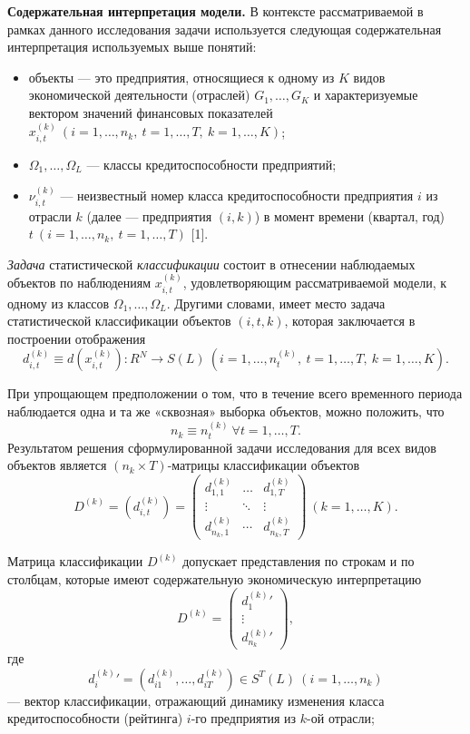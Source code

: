 \documentclass[14pt,a4paper]{extarticle}
\begin{document}
\textbf{Содержательная интерпретация модели.} В контексте рассматриваемой в рамках данного исследования задачи используется следующая содержательная интерпретация используемых выше понятий:
\begin{itemize}
    \item объекты --- это предприятия, относящиеся к одному из $K$ видов экономической деятельности (отраслей) $G_{1},\ldots,G_{K}$ и характеризуемые вектором значений финансовых показателей $x_{i,t}^{(k)}\ (i=1,\ldots,n_{k},\ t=1,\ldots,T,\ k=1,\ldots,K)$;
    \item $\Omega_{1},\ldots,\Omega_{L}$ --- классы кредитоспособности предприятий;
    \item $\nu_{i,t}^{(k)}$ --- неизвестный номер класса кредитоспособности предприятия $i$ из отрасли $k$ (далее --- предприятия $(i,k)$) в момент времени (квартал, год) $t\ (i=1,\ldots,n_{k},\ t=1,\ldots,T)$ [1].
\end{itemize}

\textit{Задача} статистической \textit{классификации} состоит в отнесении наблюдаемых объектов по наблюдениям $x_{i,t}^{(k)}$, удовлетворяющим рассматриваемой модели, к одному из классов $\Omega_{1},\ldots,\Omega_{L}$. Другими словами, имеет место задача статистической классификации объектов $(i,t,k)$, которая заключается в построении отображения
\[
d_{i,t}^{(k)} \equiv d(x_{i,t}^{(k)}): R^{N} \rightarrow S(L)\ (i=1,\ldots,n_{t}^{(k)},\ t=1,\ldots,T,\ k=1,\ldots,K).
\]

При упрощающем предположении о том, что в течение всего временного периода наблюдается одна и та же «сквозная» выборка объектов, можно положить, что
\[
n_{k} \equiv n_{t}^{(k)}\ \forall t=1,\ldots,T.
\]
Результатом решения сформулированной задачи исследования для всех видов объектов является $(n_{k} \times T)$-матрицы классификации объектов
\[
D^{(k)} = \left( d_{i,t}^{(k)} \right) = \begin{pmatrix}
d_{1,1}^{(k)} & \ldots & d_{1,T}^{(k)} \\
\vdots & \ddots & \vdots \\
d_{n_{k},1}^{(k)} & \cdots & d_{n_{k},T}^{(k)}
\end{pmatrix}\ (k=1,\ldots,K).
\]

Матрица классификации $D^{(k)}$ допускает представления по строкам и по столбцам, которые имеют содержательную экономическую интерпретацию
\[
D^{(k)} = \begin{pmatrix}
{d_{1}^{(k)}}' \\
\vdots \\
{d_{n_{k}}^{(k)}}'
\end{pmatrix},
\]
где
\[
{d_{i}^{(k)}}' = \left( d_{i1}^{(k)},\ldots,d_{iT}^{(k)} \right) \in S^{T}(L)\ (i=1,\ldots,n_{k})
\]
--- вектор классификации, отражающий динамику изменения класса кредитоспособности (рейтинга) $i$-го предприятия из $k$-ой отрасли;
\end{document}
